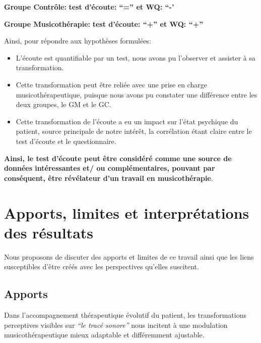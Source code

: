   \textbf{Groupe Contrôle:} 	          \textbf{ test d'écoute: ``=''   et    WQ: ``-'}


  \textbf{Groupe Musicothérapie:}     \textbf{test d'écoute: ``+''      et    WQ: ``+''}



  Ainsi, pour répondre aux hypothèses formulées:
  \begin{itemize}
       \item
          L'écoute est quantifiable  par un test, nous avons pu l'observer et   assister à sa
  transformation.

  \item Cette transformation peut être reliée  avec
  une prise en charge musicothérapeutique, puisque nous avons pu constater une différence entre les deux groupes, le GM et le GC.

  \item Cette transformation de l'écoute a eu  un impact sur l'état
  psychique du patient, source principale de notre intérêt, la corrélation étant claire entre le test d'écoute et le questionnaire.
  \end{itemize}

  \textbf{ Ainsi, le test
  d'écoute peut être considéré comme une source de données
   intéressantes et/ ou complémentaires, pouvant par conséquent, être
  \textbf{révélateur d'un
  travail en musicothérapie}}.





\section{Apports, limites et interprétations des résultats }
Nous proposons de discuter des apports et limites de ce travail ainsi que les liens susceptibles d'être créés avec les perspectives qu'elles suscitent.
\subsection{Apports}
Dans l'accompagnement thérapeutique évolutif du patient,
 les transformations perceptives visibles sur
\textit{``le tracé sonore''} nous incitent à une modulation
musicothérapeutique mieux adaptable et différemment ajustable.


